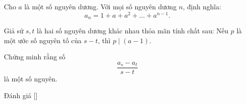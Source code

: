 \ifshowproblem
\begin{problem}\label{problem:BMO-2015-P3}
    Cho \( a \) là một số nguyên dương. Với mọi số nguyên dương \( n \), định nghĩa:
    \[
        a_n = 1 + a + a^2 + \ldots + a^{n-1}.
    \]

    Giả sử \( s, t \) là hai số nguyên dương khác nhau thỏa mãn tính chất sau:  
    Nếu \( p \) là một ước số nguyên tố của \( s - t \), thì \( p \mid (a - 1) \).

    Chứng minh rằng số
    \[
        \frac{a_s - a_t}{s - t}
    \]
    là một số nguyên.
\end{problem}
\fi

\ifshowinfo
Đánh giá [\textbf{}]\footnotemark
{}
\fi